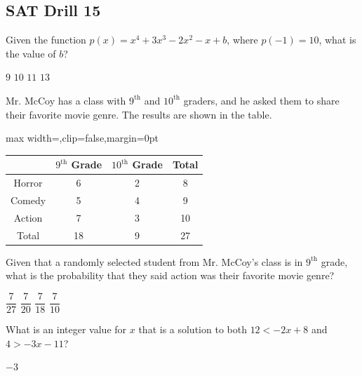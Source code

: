 
\subsection*{SAT Drill 15}

\question[1]
Given the function $p(x)=x^4+3 x^3-2 x^2-x+b$, where $p(-1)=10$, what is the value of $b$?
\begin{choices}
  \choice $9$
  \choice $10$
  \choice $11$
  \CorrectChoice $13$
\end{choices}

\question[1]
Mr. McCoy has a class with $9^{\text{th}}$ and $10^{\text{th}}$ graders, and he asked them to share their favorite movie genre. The results are shown in the table.
\begin{center}
\vspace{0.35em}
\label{tab:sat-drill-15-mccoy}
\renewcommand{\arraystretch}{1.3}
\setlength{\tabcolsep}{0.5em}
\begin{adjustbox}{max width=\linewidth,clip=false,margin=0pt}
\begin{tabular}{|c|c|c|c|}
\hline
\rowcolor[HTML]{E0E0E0}
 & $9^{\text{th}}$ Grade & $10^{\text{th}}$ Grade & Total \\
\hline
Horror & 6 & 2 & 8 \\
\hline Comedy & 5 & 4 & 9 \\
\hline Action & 7 & 3 & 10 \\
\hline Total & 18 & 9 & 27 \\
\hline
\end{tabular}
\end{adjustbox}
\end{center}
Given that a randomly selected student from Mr. McCoy's class is in $9^{\text{th}}$ grade, what is the probability that they said action was their favorite movie genre?
\begin{choices}
  \choice $\dfrac{7}{27}$
  \choice $\dfrac{7}{20}$
  \CorrectChoice $\dfrac{7}{18}$
  \choice $\dfrac{7}{10}$
\end{choices}






\newpage








\question[1]
What is an integer value for $x$ that is a solution to both $12<-2 x+8$ and $4>-3 x-11$?
\begin{solution}
$-3$
\end{solution}

